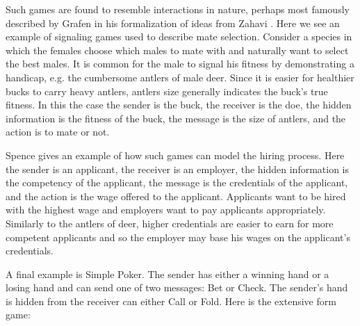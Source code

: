 \documentclass{article}
\begin{document}
Such games are found to resemble interactions in nature, perhaps most famously described by Grafen \cite{grafen1} in his formalization of ideas from Zahavi \cite{zahavi1}. Here we see an example of signaling games used to describe mate selection. Consider a species in which the females choose which males to mate with and naturally want to select the best males. It is common for the male to signal his fitness by demonstrating a handicap, e.g. the cumbersome antlers of male deer. Since it is easier for healthier bucks to carry heavy antlers, antlers size generally indicates the buck's true fitness. In this the case the sender is the buck, the receiver is the doe, the hidden information is the fitness of the buck, the message is the size of antlers, and the action is to mate or not. 

Spence \cite{spence1} gives an example of how such games can model the hiring process. Here the sender is an applicant, the receiver is an employer, the hidden information is the competency of the applicant, the message is the credentials of the applicant, and the action is the wage offered to the applicant. Applicants want to be hired with the highest wage and employers want to pay applicants appropriately. Similarly to the antlers of deer, higher credentials are easier to earn for more competent applicants and so the employer may base his wages on the applicant's credentials.

A final example is Simple Poker. The sender has either a winning hand or a losing hand and can send one of two messages: Bet or Check. The sender's hand is hidden from the receiver can either Call or Fold. Here is the extensive form game:
\end{document}
